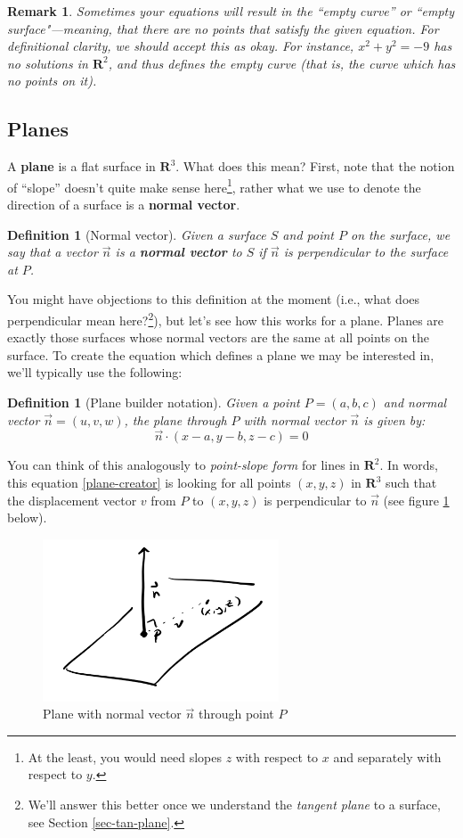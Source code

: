 \documentclass[12pt]{article}
\numberwithin{equation}{subsection}
\numberwithin{figure}{subsection}
\newtheorem{defn}[subsection]{Definition}
\theoremstyle{note}
\newtheorem{remark}[subsection]{Remark}
\begin{document}
{\begin{remark}
Sometimes your equations will result in the ``empty curve'' or ``empty surface"---meaning, that there are no points that satisfy the given equation. For definitional clarity, we should accept this as okay. For instance, $x^2+y^2=-9$ has no solutions in $\mathbf{R}^2$, and thus defines the empty curve (that is, the curve which has no points on it).
\end{remark}

\subsection{Planes} 
A \textbf{plane} is a flat surface in $\mathbf{R}^3$. What does this mean? First, note that the notion of ``slope'' doesn't quite make sense here\footnote{At the least, you would need slopes $z$ with respect to $x$ and separately with respect to $y$.}, rather what we use to denote the direction of a surface is a \textbf{normal vector}. 
\begin{defn}[Normal vector]
Given a surface $S$ and point $P$ on the surface, we say that a vector $\vec{n}$ is a \textbf{normal vector} to $S$ if $\vec{n}$ is perpendicular to the surface at $P$.
\end{defn}
You might have objections to this definition at the moment (i.e., what does perpendicular mean here?\footnote{We'll answer this better once we understand the \textit{tangent plane} to a surface, see Section \ref{sec-tan-plane}.}), but let's see how this works for a plane. Planes are exactly those surfaces whose normal vectors are the same at all points on the surface. To create the equation which defines a plane we may be interested in, we'll typically use the following: 
\begin{defn}[Plane builder notation] Given a point $P=(a,b,c)$ and normal vector $\vec{n}=(u,v,w)$, the plane through $P$ with normal vector $\vec{n}$ is given by:
\begin{equation} \label{plane-creator} \vec{n} \cdot (x-a,y-b,z-c)=0\end{equation}
\end{defn} 
You can think of this analogously to \textit{point-slope form} for lines in $\mathbf{R}^2$. In words, this equation \eqref{plane-creator} is looking for all points $(x,y,z)$ in $\mathbf{R}^3$ such that the displacement vector $v$ from $P$ to $(x,y,z)$ is perpendicular to $\vec{n}$ (see figure \ref{fig-plane} below). \begin{figure}[h!] \centering
 \includegraphics[width=70mm]{Images/plane-normal} 
  \caption{Plane with normal vector $\vec{n}$ through point $P$}
  \label{fig-plane}
\end{figure}

}
\end{document}
